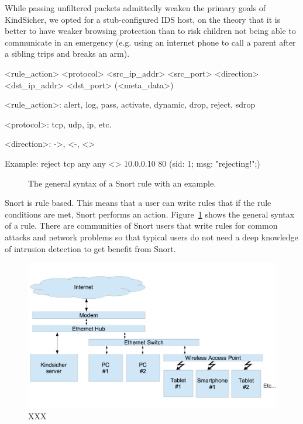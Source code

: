 While passing unfiltered packets admittedly weaken the primary goals of
KindSicher, we opted for a stub-configured IDS host, on the theory that it is
better to have weaker browsing protection than to risk children not being able
to communicate in an emergency (e.g. using an internet phone to call a parent
after a sibling trips and breaks an arm).




\begin{verbbox}
<rule_action> <protocol>
    <src_ip_addr> <src_port>
    <direction>
    <dst_ip_addr> <dst_port>
    (<meta_data>)


<rule_action>: alert, log, pass, activate,
    dynamic, drop, reject, sdrop

<protocol>: tcp, udp, ip, etc.

<direction>: ->, <-, <>

Example:
reject tcp
    any any
    <>
    10.0.0.10 80
    (sid: 1; msg: "rejecting!";)

\end{verbbox}

\begin{figure}[!t]
    \centering
    \theverbbox
    \caption{The general syntax of a Snort rule with an example.}
    \label{fig:rule_syntax}
\end{figure}

Snort is rule based. This means that a user can write rules that if the rule
conditions are met, Snort performs an action. Figure~\ref{fig:rule_syntax}
shows the general syntax of a rule. There are communities of Snort users that
write rules for common attacks and network problems so that typical users do
not need a deep knowledge of intrusion detection to get benefit from Snort.

\begin{figure}[!t]
    \centering
    \includegraphics[width=2\columnwidth]{figures/topology}
    \caption{XXX}
    \label{fig:topology}
\end{figure}

